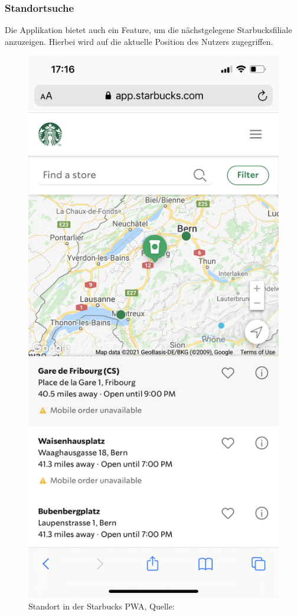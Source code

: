 \subsubsection{Standortsuche}
Die Applikation bietet auch ein Feature, um die nächstgelegene Starbucksfiliale anzuzeigen. Hierbei wird auf die aktuelle Position des Nutzers zugegriffen. 
 \begin{figure}[H]
	\centering
	\includegraphics[scale=0.10]{images/starbucks_standort.jpeg}
	\caption[Standort in der Starbucks \gls{PWA}]{Standort in der Starbucks \gls{PWA}, Quelle: \cite{starbucksPwaStandort}}
	\label{img: Standort in der Starbucks PWA}
\end{figure}

